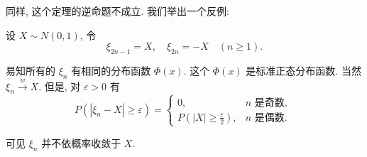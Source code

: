 同样, 这个定理的逆命题不成立. 我们举出一个反例: 

\begin{example}
    设 $X \sim N(0,1)$, 令
$$
\xi_{2 n-1}=X, \quad \xi_{2 n}=-X \quad(n \geqslant 1) .
$$

易知所有的 $\xi_n$ 有相同的分布函数 $\Phi(x)$. 这个 $\Phi(x)$ 是标准正态分布函数. 当然 $\xi_n \stackrel{w}{\longrightarrow} X$. 但是, 对 $\varepsilon>0$ 有
$$
P\left(\left|\xi_n-X\right| \geqslant \varepsilon\right)= \begin{cases}0, & n \text { 是奇数, } \\ P\left(|X| \geqslant \frac{\varepsilon}{2}\right), & n \text { 是偶数. }\end{cases}
$$

可见 $\xi_n$ 并不依概率收敛于 $X$.
\end{example}

